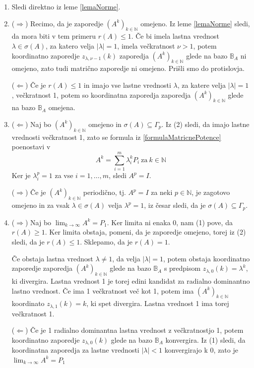 \documentclass[mat1]{fmfdelo}
\newcommand{\N}{\mathbb N}
\begin{document}
\begin{dokaz}
    \leavevmode
    \begin{enumerate}
        \item Sledi direktno iz leme \ref{lemaNorme}.
        \item ($\Rightarrow$) Recimo, da je zaporedje $(A^k)_{k\in\N}$ omejeno. Iz leme \ref{lemaNorme} sledi, da mora biti v tem primeru $r(A) \leq 1$. Če bi imela lastna vrednost $\lambda \in \sigma(A)$, za katero velja $|\lambda| = 1$, imela večkratnost $\nu > 1$, potem koordinatno zaporedje $z_{\lambda, \nu - 1}(k)$ zaporedja $(A^k)_{k\in\N}$ glede na bazo $\mathbb{B}_A$ ni omejeno, zato tudi matrično zaporedje ni omejeno. Prišli smo do protislovja.
        
        \noindent($\Leftarrow$) Če je $r(A) \leq 1$ in imajo vse lastne vrednosti $\lambda$, za katere velja $|\lambda| = 1$, večkratnost 1, potem so koordinatna zaporedja zaporedja $(A^k)_{k\in\N}$ glede na bazo $\mathbb{B}_A$ omejena.
        \item ($\Leftarrow$) Naj bo $(A^k)_{k\in\N}$ omejeno in $\sigma(A) \subseteq \Gamma_p$. Iz (2) sledi, da imajo lastne vrednosti večkratnost 1, zato se formula iz \eqref{formulaMatricnePotence} poenostavi v
        \begin{equation*}
            A^k = \sum_{i=1}^m \lambda_i^k P_i\ \text{za}\ k\in\N
        \end{equation*}
        Ker je $\lambda_i^p=1$ za vse $i=1,\ldots,m$, sledi $A^p = I$.

        \noindent($\Rightarrow$) Če je $(A^k)_{k\in\N}$ periodično, tj. $A^p = I$ za neki $p\in\N$, je zagotovo omejeno in za vsak $\lambda\in\sigma(A)$ velja $\lambda^p = 1$, iz česar sledi, da je $\sigma(A) \subseteq \Gamma_p$.
        \item ($\Rightarrow$) Naj bo $\lim_{k\rightarrow\infty} A^k = P_1$. Ker limita ni enaka 0, nam (1) pove, da $r(A) \geq 1$. Ker limita obstaja, pomeni, da je zaporedje omejeno, torej iz (2) sledi, da je $r(A) \leq 1$. Sklepamo, da je $r(A) = 1$.
        
        Če obstaja lastna vrednost $\lambda \neq 1$, da velja $|\lambda| = 1$, potem obstaja koordinatno zaporedje zaporedja $(A^k)_{k\in\N}$ glede na bazo $\mathbb{B}_A$ s predpisom $z_{\lambda,0}(k) = \lambda^k$, ki divergira. Lastna vrednost 1 je torej edini kandidat za radialno dominantno lastno vrednost. Če ima 1 večkratnost več kot 1, potem ima $(A^k)_{k\in\N}$ koordinato $z_{\lambda,1}(k) = k$, ki spet divergira. Lastna vrednost 1 ima torej večkratnost 1.

        \noindent($\Leftarrow$) Če je 1 radialno dominantna lastna vrednost z večkratnostjo 1, potem koordinatno zaporedje $z_{\lambda,0}(k)$ glede na bazo $\mathbb{B}_A$ konvergira. Iz (1) sledi, da koordinatna zaporedja za lastne vrednosti $|\lambda| < 1$ konvergirajo k 0, zato je $\lim_{k\rightarrow\infty} A^k = P_1$
    \end{enumerate}
\end{dokaz}
\end{document}

